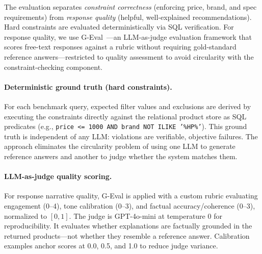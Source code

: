\documentclass[sigconf,anonymous]{acmart}
\begin{document}
The evaluation separates \emph{constraint correctness} (enforcing price, brand,
and spec requirements) from \emph{response quality} (helpful, well-explained
recommendations). Hard constraints are evaluated deterministically via SQL
verification. For response quality, we use G-Eval~\cite{Liu2023GEval}---an
LLM-as-judge evaluation framework that scores free-text responses against a
rubric without requiring gold-standard reference answers---restricted to
quality assessment to avoid circularity with the constraint-checking component.

\paragraph{Deterministic ground truth (hard constraints).}
For each benchmark query, expected filter values and exclusions
are derived by executing the constraints directly against the relational
product store as SQL predicates
(e.g., {\small\texttt{price <= 1000 AND brand NOT ILIKE '\%HP\%'}}).
This ground truth is independent of any LLM: violations are verifiable,
objective failures. The approach eliminates the circularity problem of using
one LLM to generate reference answers and another to judge whether the
system matches them.

\paragraph{LLM-as-judge quality scoring.}
For response narrative quality, G-Eval is applied with a
custom rubric evaluating engagement (0--4), tone calibration (0--3), and
factual accuracy/coherence (0--3), normalized to $[0,1]$.
The judge is GPT-4o-mini at temperature 0 for reproducibility.
It evaluates whether explanations are factually grounded in the returned
products---not whether they resemble a reference answer.
Calibration examples anchor scores at 0.0, 0.5, and 1.0 to reduce judge
variance.
\end{document}
